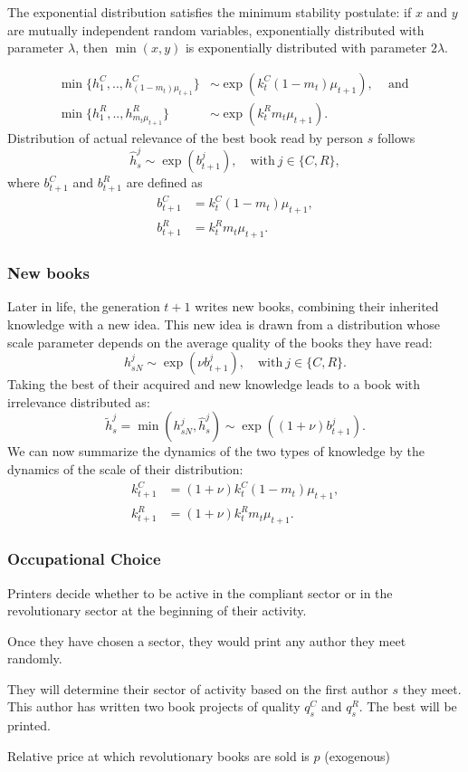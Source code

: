 \documentclass[usepdftitle=false,aspectratio=169,xcolor=dvipsnames]{beamer}
\begin{document}
	\begin{frame}
The exponential distribution satisfies the minimum stability postulate: if $x$ and $y$ are mutually independent random variables, exponentially distributed with parameter $\lambda$, then $\min(x,y)$ is exponentially distributed with parameter $2\lambda$.

\begin{align*}
\min\{h^C_1,..,h^C_{(1-m_{t}) \mu_{t+1}}\}& \sim \exp(k^C_{t} (1-m_{t}) \mu_{t+1}),\;\;\;\mbox{ and }\\
\min\{h^R_1,..,h^R_{ m_{t} \mu_{t+1} }\}& \sim \exp(k^R_{t} m_{t} \mu_{t+1}).
 \end{align*}
Distribution of actual relevance of the best book read by person $s$ follows
\begin{equation}
 \hat{h}^j_s \sim \exp(b_{t+1}^j), \quad \text{with} \ j\in \{C,R\},
\end{equation}
where $b_{t+1}^C$ and $b_{t+1}^R$ are defined as
 \begin{align*}
  b_{t+1}^C&=k_{t}^C (1-m_{t}) \mu_{t+1}, \\
  b_{t+1}^R&=k_{t}^R m_{t}  \mu_{t+1}.
 \end{align*}

\end{frame}


	\begin{frame}
\frametitle{New books}
Later in life, the generation $t+1$ writes new books,  combining their inherited knowledge with a new idea. This new idea is drawn from a distribution whose scale parameter depends on the average quality of the books they have read:
$$
h^j_{sN}\sim  \exp(\nu b^j_{t+1}), \quad \text{with} \ j\in \{C,R\}.
$$
Taking the best of their acquired and new knowledge leads to a book with irrelevance distributed as:
\begin{equation}
\tilde h^j_s=\min(h^j_{sN},\hat h^j_s) \sim  \exp((1+\nu) b^j_{t+1}). \label{eq:writing}
\end{equation}
We can now summarize the dynamics of the two types of knowledge by the dynamics of the scale of their distribution:
 \begin{align}
  k_{t+1}^C&=(1+\nu) k_{t}^C (1-m_{t}) \mu_{t+1},\label{eq:kCtime} \\
  k_{t+1}^R&=(1+\nu) k_{t}^R m_{t} \mu_{t+1}. \label{eq:kRtime}
 \end{align}
\end{frame}



	\begin{frame}
\frametitle{Occupational Choice}

Printers decide whether to be active in the compliant sector or in the revolutionary sector at the beginning of their activity.

Once they have chosen a sector, they would print any author they meet randomly.

They will  determine their sector of activity based on the first author $s$ they meet. This author has written two book projects of quality $q^C_s$ and $q^R_s $. The best will be printed.

Relative price at which revolutionary books are sold is $p$ (exogenous)
\end{frame}
\end{document}

